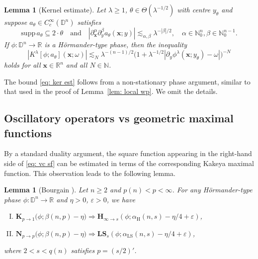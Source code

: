 \documentclass[reqno]{amsart}
\numberwithin{equation}{section}
\newcommand{\D}{\mathbb{D}}
\newcommand{\N}{\mathbb{N}}
\newcommand{\R}{\mathbb{R}}
\newcommand{\bx}{\mathbf{x}}
\newcommand{\bH}{\mathbf{H}}
\newcommand{\bK}{\mathbf{K}}
\newcommand{\bN}{\mathbf{N}}
\newcommand{\bLS}{\mathbf{LS}}
\theoremstyle{plain}
\newtheorem{lemma}[theorem]{Lemma}
\theoremstyle{definition}
\newcommand{\supp}{\mathrm{supp}\,}
\begin{document}
\begin{lemma}[Kernel estimate]\label{lem: ker est} Let $\lambda \geq 1$, $\theta \in \Theta(\lambda^{-1/2})$ with centre $y_{\theta}$ and suppose $a_{\theta} \in C^{\infty}_c(\D^n)$ satisfies
\begin{equation*}
\supp a_{\theta} \subseteq 2 \cdot \theta \quad \textrm{and} \quad |\partial_{\bx}^{\alpha} \partial_y^{\beta} a_{\theta}(\bx;y)| \lesssim_{\alpha, \beta} \lambda^{-|\beta|/2}, \quad \alpha \in \N_0^n, \beta \in \N_0^{n-1}. 
\end{equation*}
If $\phi \colon \D^n \to \R$ is a H\"ormander-type phase, then the inequality 
\begin{equation}\label{eq: ker est}
   |K^{\lambda}[\phi; a_{\theta}](\bx;\omega)| \lesssim_N \lambda^{-(n-1)/2}\big(1 + \lambda^{-1/2}|\partial_y \phi^{\lambda}(\bx;y_{\theta}) - \omega| \big)^{-N}
\end{equation}
holds for all $\bx \in \R^n$ and all $N \in \N$.
\end{lemma}

The bound \eqref{eq: ker est} follows from a non-stationary phase argument, similar to that used in the proof of Lemma~\ref{lem: local wp}. We omit the details.




\subsection{Oscillatory operators vs geometric maximal functions} 

By a standard duality argument, the square function appearing in the right-hand side of \eqref{eq: vc sf} can be estimated in terms of the corresponding Kakeya maximal function. This observation leads to the following lemma.  

\begin{lemma}[Bourgain \cite{Bourgain1991}]\label{lem: Hor vs Kak} Let $n \geq 2$ and $p(n) < p < \infty$. For  any H\"ormander-type phase $\phi \colon \D^n \to \R$ and $\eta > 0$, $\varepsilon > 0$, we have
\begin{enumerate}[I)]
    \item $\bK_{p \to 1}\big(\phi;  \beta(n, p) - \eta\big) \Rightarrow \bH_{\infty \to s}(\phi; \alpha_{\mathrm{H}}(n, s) - \eta/4 + \varepsilon)$,
    \item $\bN_{p \to p}\big(\phi;  \beta(n, p) - \eta\big) \Rightarrow \bLS_s(\phi; \alpha_{\mathrm{LS}}(n, s) - \eta/4 + \varepsilon)$,
\end{enumerate}
where $2 < s < q(n)$ satisfies $p = (s/2)'$.
\end{lemma}
\end{document}
